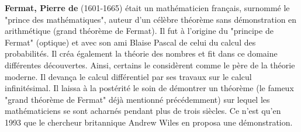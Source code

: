 \textbf{Fermat, Pierre de} (1601-1665) était un mathématicien français, surnommé le "prince des mathématiques", auteur d'un célèbre théorème sans démonstration en arithmétique (grand théorème de Fermat). Il fut à l'origine du "principe de Fermat" (optique) et avec son ami Blaise Pascal de celui du calcul des probabilités. Il créa également la théorie des nombres et fit dans ce domaine différentes découvertes. Ainsi, certains le considèrent comme le père de la théorie moderne. Il devança le calcul différentiel par ses travaux sur le calcul infinitésimal. Il laissa à la postérité le soin de démontrer un théorème (le fameux "grand théorème de Fermat" déjà mentionné précédemment) sur lequel les mathématiciens se sont acharnés pendant plus de trois siècles. Ce n'est qu'en 1993 que le chercheur britannique Andrew Wiles en proposa une démonstration.


